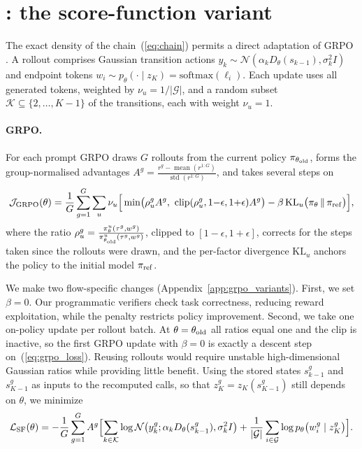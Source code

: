 \section{\methodGRPO{}: the score-function variant}
\label{sec:grpo}
The exact density of the chain~(\ref{eq:chain}) permits a direct adaptation of GRPO \citep{shao2024deepseekmath}. A rollout comprises Gaussian transition actions $y_k\sim\mathcal N(\alpha_kD_\theta(s_{k-1}),\sigma_k^2I)$ and endpoint tokens $w_i\sim p_\theta(\cdot\mid z_K)=\mathrm{softmax}(\ell_i)$. Each update uses all generated tokens, weighted by $\nu_u=1/|\mathcal G|$, and a random subset $\mathcal K\subseteq\{2,\dots,K-1\}$ of the transitions, each with weight $\nu_u=1$.

\paragraph{GRPO.}
For each prompt GRPO draws $G$ rollouts from the current policy $\pi_{\theta_{\rm old}}$, forms the group-normalised advantages $A^g=\frac{r^g-\operatorname{mean}(r^{1:G})}{\operatorname{std}(r^{1:G})}$, and takes several steps on
\begin{equation}
\mathcal J_{\rm GRPO}(\theta)=\frac1G\sum_{g=1}^{G}\sum_{u}\nu_u\Big[\min\!\big(\rho^g_uA^g,\ \mathrm{clip}(\rho^g_u,1{-}\epsilon,1{+}\epsilon)A^g\big)-\beta\,\mathrm{KL}_u\big(\pi_\theta\,\|\,\pi_{\rm ref}\big)\Big],
\label{eq:original_grpo}
\end{equation}
where the ratio $\rho^g_u=\frac{\pi^u_\theta(\tau^g,w^g)}{\pi^u_{\theta_{\rm old}}(\tau^g,w^g)}$, clipped to $[1{-}\epsilon,1{+}\epsilon]$, corrects for the steps taken since the rollouts were drawn, and the per-factor divergence $\mathrm{KL}_u$ anchors the policy to the initial model $\pi_{\rm ref}$.

\runin{\methodGRPO{}}We make two flow-specific changes (Appendix~\ref{app:grpo_variants}). First, we set $\beta=0$. Our programmatic verifiers check task correctness, reducing reward exploitation, while the penalty restricts policy improvement. Second, we take one on-policy update per rollout batch. At $\theta=\theta_{\rm old}$ all ratios equal one and the clip is inactive, so the first GRPO update with $\beta=0$ is exactly a descent step on~(\ref{eq:grpo_loss}). Reusing rollouts would require unstable high-dimensional Gaussian ratios while providing little benefit. Using the stored states $s^g_{k-1}$ and $s^g_{K-1}$ as inputs to the recomputed calls, so that $z_K^g=z_K(s^g_{K-1})$ still depends on $\theta$, we minimize
\begin{equation}
\mathcal L_{\mathrm{SF}}(\theta)=-\frac1G\sum_{g=1}^{G}A^g\Bigl[\sum_{k\in\mathcal K}\log\mathcal N\bigl(y^g_k;\alpha_kD_\theta(s^g_{k-1}),\sigma_k^2I\bigr)+\frac{1}{|\mathcal G|}\sum_{i\in\mathcal G}\log p_\theta\bigl(w^g_i\mid z^g_K\bigr)\Bigr].
\label{eq:grpo_loss}
\end{equation}

